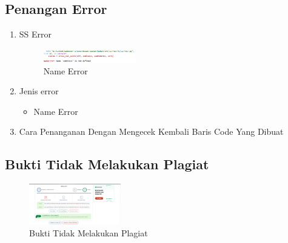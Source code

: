 \subsection{Penangan Error}
\begin{enumerate}
	\item SS Error
	\hfill\break
		\begin{figure}[H]
			\includegraphics[width=4cm]{figures/1164013/err/5_name_error.png}
			\centering
			\caption{Name Error}
		\end{figure}
	\item Jenis error
	\begin{itemize}
		\item Name Error
	\end{itemize}
	\item Cara Penanganan
	\hfill\break
	Dengan Mengecek Kembali Baris Code Yang Dibuat
\end{enumerate}
\subsection{Bukti Tidak Melakukan Plagiat}
\hfill\break
\begin{figure}[H]
	\includegraphics[width=4cm]{figures/1164013/ve/5.png}
	\centering
	\caption{Bukti Tidak Melakukan Plagiat}
\end{figure}